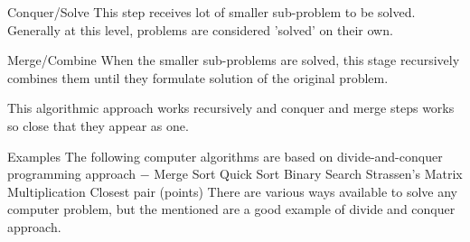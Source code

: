 \documentclass{beamer}
\begin{document}
\begin{frame}
Conquer/Solve
This step receives lot of smaller sub-problem to be solved. Generally at this level, problems are considered 'solved' on their own.

Merge/Combine
When the smaller sub-problems are solved, this stage recursively combines them until they formulate solution of the original problem.
\end{frame}
\begin{frame}
This algorithmic approach works recursively and conquer and merge steps works so close that they appear as one.


\end{frame}
\begin{frame}
Examples
The following computer algorithms are based on divide-and-conquer programming approach −
Merge Sort
Quick Sort
Binary Search
Strassen's Matrix Multiplication
Closest pair (points)
There are various ways available to solve any computer problem, but the mentioned are a good example of divide and conquer approach.

\end{frame}
\end{document}
